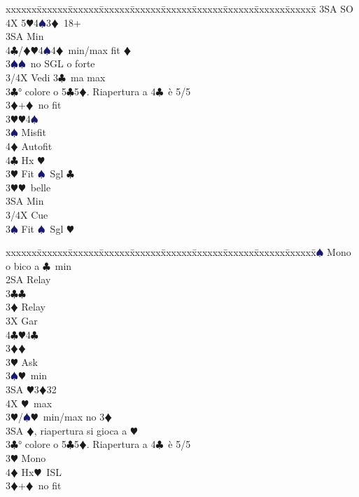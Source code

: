 \documentclass[a4paper,italian]{article}
\newcommand{\BC}{\textcolor{OliveGreen}{$\clubsuit$}}
\newcommand{\BD}{\textcolor{RedOrange}{$\vardiamondsuit$}}
\newcommand{\BH}{\textcolor{Red2}{$\varheartsuit${}}}
\newcommand{\BS}{\textcolor{MidnightBlue}{$\spadesuit${}}}
\newenvironment{bidtable}
{\begin{tabbing}

    xxxxxx\=xxxxxx\=xxxxxx\=xxxxxx\=xxxxxx\=xxxxxx\=xxxxxx\=xxxxxx\=xxxxxx\=xxxxxx\=\kill}
{\end{tabbing} }%
\begin{document}
\begin{multicols}{2}
\begin{bidtable}
        3SA \> SO\+\\
        4X 5\BH 4\BS 3\BD\ 18+\-\-\\
        3SA \> Min\\
        4\BC/\BD {}\BH 4\BS 4\BD\ min/max fit \BD \-\\
        3\BS {}\BS\ no SGL o forte\-\\
        3/4X \> Vedi 3\BC\ ma max\-\\
        3\BC {}° colore o 5\BC 5\BD . Riapertura a 4\BC\ è 5/5\\
        3\BD {}+\BD\ no fit\+\\
        3\BH {}\BH 4\BS \+\\
        3\BS \> Misfit\\
        4\BD \> Autofit\\
        4\BC \> Hx \BH \-\-\\
        3\BH \> Fit \BS\ Sgl \BC \+\\
        3\BH {}\BH\ belle\\
        3SA \> Min\\
        3/4X \> Cue\-\\
        3\BS \> Fit \BS\ Sgl \BH \-\\
    \end{bidtable}
    \columnbreak
    \begin{bidtable}
        2\BS \> Mono o bico a \BC\ min\+\\
        2SA \> Relay\+\\
        3\BC {}\BC \+\\
        3\BD \> Relay\+\\
        3X \> Gar\\
        4\BC {}\BH 4\BC \-\-\\
        3\BD {}\BD \+\\
        3\BH \> Ask\+\\
        3\BS {}\BH\ min\\
        3SA \BH 3\BD 32\\
        4X \BH\ max\-\-\\
        3\BH/\BS {}\BH\ min/max no 3\BD \\
        3SA \BD , riapertura si gioca a \BH \-\\
        3\BC {}° colore o 5\BC 5\BD . Riapertura a 4\BC\ è 5/5\+\\
        3\BH \> Mono\+\\
        4\BD \> Hx\BH\ ISL\-\-\\
        3\BD {}+\BD\ no fit\+\\

\end{bidtable}
\end{multicols}
\end{document}

